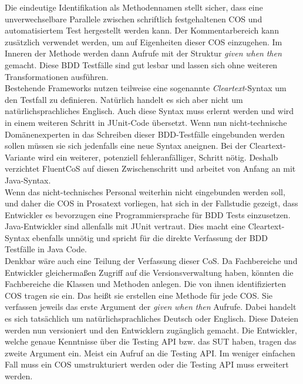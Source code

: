 Die eindeutige Identifikation als Methodennamen stellt sicher, dass eine unverwechselbare Parallele zwischen schriftlich festgehaltenen \Gls{COS} und automatisiertem Test hergestellt werden kann. Der Kommentarbereich kann zusätzlich verwendet werden, um auf Eigenheiten dieser \Gls{COS} einzugehen. Im Inneren der Methode werden dann Aufrufe mit der Struktur \textit{given} \textit{when} \textit{then} gemacht. Diese \Gls{BDD} Testfälle sind gut lesbar und lassen sich ohne weiteren Transformationen ausführen.\\
Bestehende Frameworks nutzen teilweise eine sogenannte \textit{Cleartext}-Syntax um den Testfall zu definieren. Natürlich handelt es sich aber nicht um natürlichsprachliches Englisch. Auch diese Syntax muss erlernt werden und wird in einem weiteren Schritt in JUnit-Code übersetzt. Wenn nun nicht-technische Domänenexperten in das Schreiben dieser BDD-Testfälle eingebunden werden sollen müssen sie sich jedenfalls eine neue Syntax aneignen. Bei der Cleartext-Variante wird ein weiterer, potenziell fehleranfälliger, Schritt nötig. Deshalb verzichtet FluentCoS auf diesen Zwischenschritt und arbeitet von Anfang an mit Java-Syntax.\\
Wenn das nicht-technisches Personal weiterhin nicht eingebunden werden soll, und daher die \Gls{COS} in Prosatext vorliegen, hat sich in der Fallstudie gezeigt, dass Entwickler es bevorzugen eine Programmiersprache für \Gls{BDD} Tests einzusetzen. Java-Entwickler sind allenfalls mit JUnit vertraut. Dies macht eine Cleartext-Syntax ebenfalls unnötig und spricht für die direkte Verfassung der \Gls{BDD} Testfälle in Java Code.\\
Denkbar wäre auch eine Teilung der Verfassung dieser CoS. Da Fachbereiche und Entwickler gleichermaßen Zugriff auf die Versionsverwaltung haben, könnten die Fachbereiche die Klassen und Methoden anlegen. Die von ihnen identifizierten \Gls{COS} tragen sie ein. Das heißt sie erstellen eine Methode für jede \Gls{COS}. Sie verfassen jeweils das erste Argument der \textit{given} \textit{when} \textit{then} Aufrufe. Dabei handelt es sich tatsächlich um natürlichsprachliches Deutsch oder Englisch. Diese Dateien werden nun versioniert und den Entwicklern zugänglich gemacht. Die Entwickler, welche genaue Kenntnisse über die Testing API bzw. das \Gls{SUT} haben, tragen das zweite Argument ein. Meist ein Aufruf an die Testing API. Im weniger einfachen Fall muss ein \Gls{COS} umstrukturiert werden oder die Testing API muss erweitert werden.\\ 
